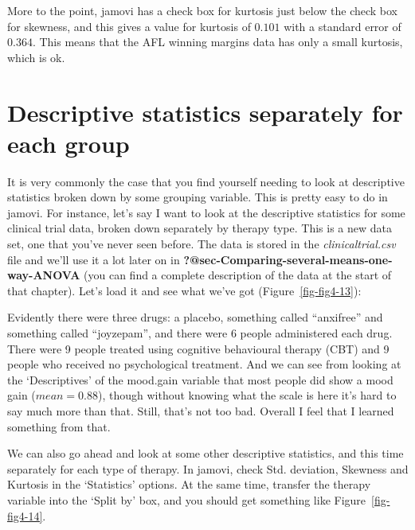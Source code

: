 \documentclass[
  a4paper,
]{book}
\begin{document}
More to the point, jamovi has a check box for kurtosis just below the
check box for skewness, and this gives a value for kurtosis of \(0.101\)
with a standard error of \(0.364\). This means that the AFL winning
margins data has only a small kurtosis, which is ok.

\hypertarget{descriptive-statistics-separately-for-each-group}{%
\section{Descriptive statistics separately for each
group}\label{descriptive-statistics-separately-for-each-group}}

It is very commonly the case that you find yourself needing to look at
descriptive statistics broken down by some grouping variable. This is
pretty easy to do in jamovi. For instance, let's say I want to look at
the descriptive statistics for some clinical trial data, broken down
separately by therapy type. This is a new data set, one that you've
never seen before. The data is stored in the \emph{clinicaltrial.csv}
file and we'll use it a lot later on in
\textbf{?@sec-Comparing-several-means-one-way-ANOVA} (you can find a
complete description of the data at the start of that chapter). Let's
load it and see what we've got (Figure~\ref{fig-fig4-13}):

Evidently there were three drugs: a placebo, something called
``anxifree'' and something called ``joyzepam'', and there were 6 people
administered each drug. There were 9 people treated using cognitive
behavioural therapy (CBT) and 9 people who received no psychological
treatment. And we can see from looking at the `Descriptives' of the
mood.gain variable that most people did show a mood gain
(\(mean = 0.88\)), though without knowing what the scale is here it's
hard to say much more than that. Still, that's not too bad. Overall I
feel that I learned something from that.

We can also go ahead and look at some other descriptive statistics, and
this time separately for each type of therapy. In jamovi, check Std.
deviation, Skewness and Kurtosis in the `Statistics' options. At the
same time, transfer the therapy variable into the `Split by' box, and
you should get something like Figure~\ref{fig-fig4-14}.
\end{document}
